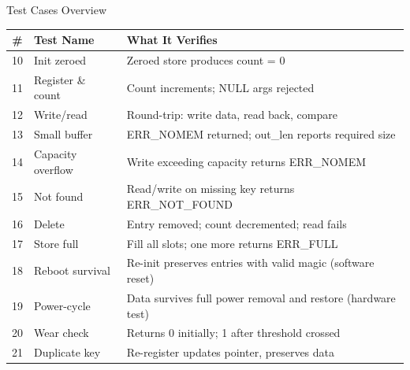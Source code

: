 \documentclass[aspectratio=169, 10pt]{beamer}
\begin{document}
\begin{frame}{Test Cases Overview}
\begin{table}
\centering
\small
\begin{tabular}{@{}clp{7cm}@{}}
\toprule
\textbf{\#} & \textbf{Test Name} & \textbf{What It Verifies} \\
\midrule
10 & Init zeroed        & Zeroed store produces count = 0 \\
11 & Register \& count  & Count increments; NULL args rejected \\
12 & Write/read         & Round-trip: write data, read back, compare \\
13 & Small buffer       & ERR\_NOMEM returned; out\_len reports required size \\
14 & Capacity overflow  & Write exceeding capacity returns ERR\_NOMEM \\
15 & Not found          & Read/write on missing key returns ERR\_NOT\_FOUND \\
16 & Delete             & Entry removed; count decremented; read fails \\
17 & Store full         & Fill all slots; one more returns ERR\_FULL \\
18 & Reboot survival    & Re-init preserves entries with valid magic (software reset) \\
19 & Power-cycle        & Data survives full power removal and restore (hardware test) \\
20 & Wear check         & Returns 0 initially; 1 after threshold crossed \\
21 & Duplicate key      & Re-register updates pointer, preserves data \\
\bottomrule
\end{tabular}
\end{table}
\end{frame}
\end{document}
